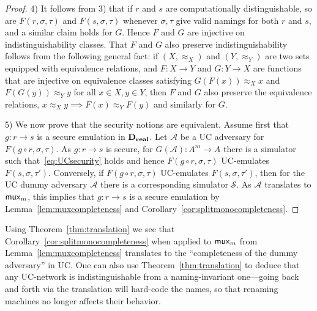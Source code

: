 \begin{proof}
4) It follows from 3) that if $r$ and $s$ are computationally distinguishable, so are $F(r,\sigma,\tau)$ and $F(s,\sigma,\tau)$ whenever $\sigma,\tau$ give valid namings for both $r$ and $s$, and a similar claim holds for $G$. Hence $F$ and $G$ are injective on indistinguishability classes. That $F$ and $G$ also preserve indistinguishability follows from the following general fact: if $(X,\approx_X)$ and $(Y,\approx_Y)$ are two sets equipped with equivalence relations, and $F \colon X\to Y$ and $G \colon Y\to X$ are functions that are injective on equivalence classes satisfying $G(F(x))\approx_X x$ and $F(G(y))\approx_Y y$ for all $x\in X, y \in Y$, then $F$ and $G$ also preserve the equivalence relations, \ie $x \approx_X y \implies F(x) \approx_Y F(y)$ and similarly for $G$. 

5) We now prove that the security notions are equivalent. Assume first that $g \colon r\to s$ is a secure emulation in $\mathbf{D_{real}}$. Let $\mathcal{A}$ be a UC adversary for $F(g\circ r,\sigma,\tau)$. As $g \colon r\to s$ is secure, for $G(\mathcal{A}) \colon A^m\to A$ there is a simulator such that~\eqref{eq:UCsecurity} holds and hence $F(g \circ  r,\sigma,\tau)$ UC-emulates $F(s,\sigma,\tau')$. Conversely, if $F(g \circ  r,\sigma,\tau)$ UC-emulates $F(s,\sigma,\tau')$, then for the UC dummy adversary $\mathcal{A} $ there is a corresponding simulator $\mathcal{S}$. As $\mathcal{A}$ translates to $\mathsf{mux}_m$, this implies that  $g \colon r\to s$ is a secure emulation by Lemma~\ref{lem:muxcompleteness} and Corollary~\ref{cor:splitmonocompleteness}. 
\end{proof}


Using Theorem~\ref{thm:translation}  we see that Corollary~\ref{cor:splitmonocompleteness} when applied to $\mathsf{mux}_m$ from Lemma~\ref{lem:muxcompleteness} translates to the ``completeness of the dummy adversary'' in UC. One can also use Theorem~\ref{thm:translation} to deduce that any UC-network is indistinguishable from a naming-invariant one---going back and forth via the translation will hard-code the names, so that renaming machines no longer affects their behavior. 

